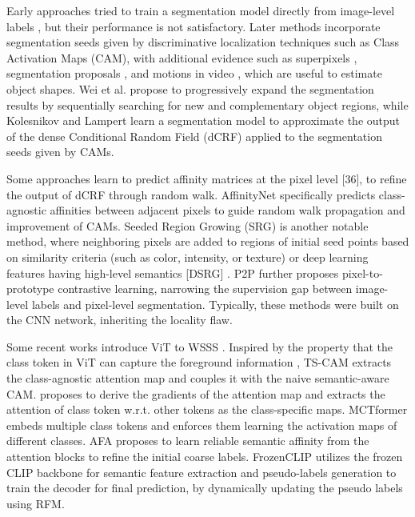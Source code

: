 Early approaches tried to train a segmentation model directly from image-level labels \cite{dcnn}, but their performance is not satisfactory. Later methods incorporate segmentation seeds given by discriminative localization techniques such as Class Activation Maps (CAM)\cite{cam}, with additional evidence such as superpixels \cite{imagelevelpixel}, segmentation proposals \cite{imagelevelpixel}, and motions in video \cite{wsss_motion_cues}, which are useful to estimate object shapes. Wei et al.\cite{adversarial_erasing} propose to progressively expand the segmentation results by sequentially searching for new and complementary object regions, while Kolesnikov and Lampert \cite{kolesnikov2016} learn a segmentation model to approximate the output of the dense Conditional Random Field (dCRF) \cite{krähenbühl} applied to the segmentation seeds given by CAMs.

Some approaches learn to predict affinity matrices at the pixel level [36], to refine the output of dCRF through random walk. AffinityNet \cite{wsss_affinitynet} specifically predicts class-agnostic affinities between adjacent pixels to guide random walk propagation and improvement of CAMs. Seeded Region Growing (SRG) \cite{srg} is another notable method, where neighboring pixels are added to regions of initial seed points based on similarity criteria (such as color, intensity, or texture) or deep learning features having high-level semantics [DSRG] \cite{wsss_dsrg_deep_seeded_region_growing}.  P2P \cite{pixel_to_prototype} further proposes pixel-to-prototype contrastive learning, narrowing the supervision gap between image-level labels and pixel-level segmentation. Typically, these methods were built on the CNN network, inheriting the locality flaw.

Some recent works introduce ViT to WSSS \cite{camtokens, getam}. Inspired by the property that the class token in ViT can capture the foreground information \cite{caron}, TS-CAM\cite{camtokens} extracts the class-agnostic attention map and couples it with the naive semantic-aware CAM. \cite{getam} proposes to derive the gradients of the attention map and extracts the attention of class token w.r.t. other tokens as the class-specific maps. MCTformer \cite{wsss_MCTformer} embeds multiple class tokens and enforces them learning the activation maps of different classes. AFA \cite{wsss_afa_affinity_from_attention} proposes to learn reliable semantic affinity from the attention blocks to refine the initial coarse labels. FrozenCLIP \cite{wsss_frozen_clip} utilizes the frozen CLIP backbone for semantic feature extraction and pseudo-labels generation to train the decoder for final prediction, by dynamically updating the pseudo labels using RFM.



